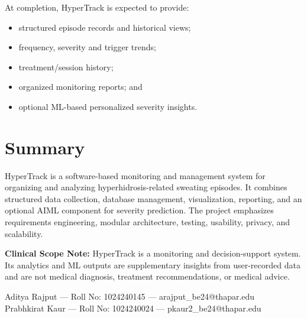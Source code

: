 \documentclass[11pt,a4paper]{article}
\begin{document}
At completion, HyperTrack is expected to provide:

\begin{itemize}
\item structured episode records and historical views;
\item frequency, severity and trigger trends;
\item treatment/session history;
\item organized monitoring reports; and
\item optional ML-based personalized severity insights.
\end{itemize}

\begin{center}
\end{center}

\section{Summary}

HyperTrack is a software-based monitoring and management system for organizing and analyzing hyperhidrosis-related sweating episodes. It combines structured data collection, database management, visualization, reporting, and an optional AIML component for severity prediction. The project emphasizes requirements engineering, modular architecture, testing, usability, privacy, and scalability.

\textbf{Clinical Scope Note:} HyperTrack is a monitoring and decision-support system. Its analytics and ML outputs are supplementary insights from user-recorded data and are not medical diagnosis, treatment recommendations, or medical advice.

\vspace{8pt}
\begin{center}
Aditya Rajput --- Roll No: 1024240145 --- arajput\_be24@thapar.edu\\
Prabhkirat Kaur --- Roll No: 1024240024 --- pkaur2\_be24@thapar.edu
\end{center}
\end{document}
